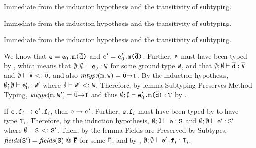 {\begin{description}

Immediate from the induction hypothesis and the transitivity of subtyping.


Immediate from the induction hypothesis and the transitivity of subtyping.


Immediate from the induction hypothesis and the transitivity of subtyping.


We know that ${\e = {\invoke {\e_0} {\mof \dd}}}$ and $\ep = \invoke {\e_0'}
{\mof \dd}$. Further, $\e$ must have been typed by ,
which means that $\eept {\e_0} \W$ for some ground type $\W$, and that
$\eept \od \oV$ and $\esub \oV \oU$, and also $\mtype \m \W = \arrType
\oU \T$.  By the induction hypothesis, $\eept {\e_0'} \Wp$ where $\esub
\Wp \W$.  Therefore, by lemma Subtyping Preserves Method Typing,
$\mtype \m \Wp = \arrType \oU \T$ and thus $\eept {\invoke {\e_0'}
 {\mof \dd}} \T$ by .


If $\trans {\invoke \e \f_i} {\invoke \ep \f_i}$, then $\trans \e
\ep$.  Further, ${\invoke \e \f_i}$ must have been typed by
 to have type $\T_i$.  Therefore, by the induction
hypothesis, $\eept \e \SSS$ and $\eept \ep \Sp$ where $\esub \SSS
\Sp$.  Then, by the lemma Fields are Preserved by Subtypes, $\fields
\Sp = \fields {\SSS}\ @\ \oF$ for some $\oF$, and by
, $\eept {\invoke \ep \f_i} \T_i$.

\end{description}
}

